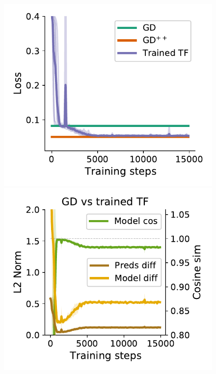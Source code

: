 \documentclass{article}
\theoremstyle{plain}
\theoremstyle{definition}
\theoremstyle{remark}
\begin{document}
\begin{figure}
\begin{center}
\begin{minipage}{.30\textwidth}
  \centering
  \begin{center}
    \includegraphics[width=1.\textwidth]{Final_figures/linear/ten_layers_rec/train_3.pdf}
  \end{center}
  \vspace{-10pt}
\end{minipage}
\begin{minipage}{.30\textwidth}
  \centering
  \begin{center}
    \includegraphics[width=1.\textwidth]{Final_figures/linear/ten_layers_rec/sim_3.pdf}

\end{center}
\end{minipage}
\end{center}
\end{figure}
\end{document}
